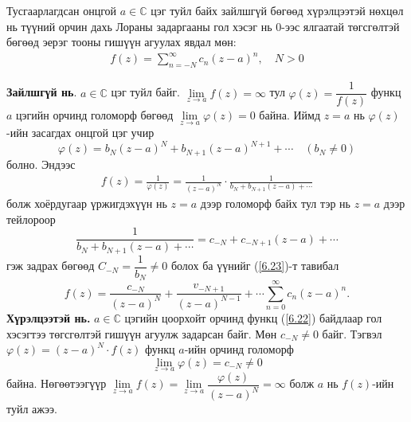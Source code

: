 \begin{thm} \label{Теорем 6.2.2}
Тусгаарлагдсан онцгой $a\in\mathbb{C}$ цэг туйл байх зайлшгүй бөгөөд хүрэлцээтэй нөхцөл нь түүний орчин дахь Лораны задаргааны гол хэсэг нь $0$-ээс ялгаатай төгсгөлтэй бөгөөд эерэг тооны гишүүн агуулах явдал мөн:
\begin{eqnarray}\label{6.22}
f(z)=\sum\limits_{n=-N}^\infty c_n(z-a)^n, \quad N>0
\end{eqnarray}
\end{thm}
\begin{prf}
\textbf{Зайлшгүй нь}. $a\in\mathbb{C}$ цэг туйл байг. $\lim\limits_{z\rightarrow a}f(z)=\infty$ тул $\varphi(z)=\dfrac{1}{f(z)}$ функц $a$ цэгийн орчинд голоморф бөгөөд $\lim\limits_{z\rightarrow a}\varphi(z)=0$ байна. Иймд $z=a$ нь $\varphi(z)$-ийн засагдах онцгой цэг учир
$$\varphi(z)=b_N (z-a)^N+b_{N+1}(z-a)^{N+1}+\cdots \quad (b_N\neq 0)$$
болно. Эндээс
\begin{eqnarray} \label{6.23}
f(z)=\frac{1}{\varphi(z)}=\frac{1}{(z-a)^N}\cdot \frac{1}{b_N+b_{N+1}(z-a)+\cdots}
\end{eqnarray}
болж хоёрдугаар үржигдэхүүн нь $z=a$ дээр голоморф байх тул тэр нь $z=a$ дээр тейлороор
$$\frac{1}{b_N+b_{N+1}(z-a)+\cdots}=c_{-N}+c_{-N+1}(z-a)+\cdots$$
гэж задрах бөгөөд $C_{-N}=\dfrac{1}{b_N}\neq 0$ болох ба үүнийг (\ref{6.23})-т тавибал 
$$f(z)=\frac{c_{-N}}{(z-a)^N}+\frac{v_{-N+1}}{(z-a)^{N-1}}+\cdots \sum\limits_{n=0}^\infty c_n(z-a)^n.$$
\textbf{Хүрэлцээтэй нь.} $a\in\mathbb{C}$ цэгийн цоорхойт орчинд  функц (\ref{6.22}) байдлаар гол хэсэгтээ төгсгөлтэй гишүүн агуулж задарсан байг. Мөн $c_{-N}\neq 0$ байг. Тэгвэл $\varphi(z)=(z-a)^N\cdot f(z)$ функц $a$-ийн орчинд голоморф
$$\lim\limits_{z\rightarrow a}\varphi(z) =c_{-N}\neq 0$$
байна. Нөгөөтээгүүр $\lim\limits_{z\rightarrow a}f(z) =\lim\limits_{z\rightarrow a}\dfrac{\varphi (z)}{(z-a)^N}=\infty$  болж $a$ нь $f(z)$-ийн туйл ажээ. 
 \end{prf}

